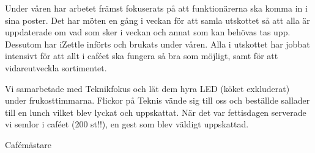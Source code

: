 \documentclass[../_main/handlingar.tex]{subfiles}
\begin{document}

Under våren har arbetet främst fokuserats på att funktionärerna ska komma in i sina poster. Det har möten en gång i veckan för att samla utskottet så att alla är uppdaterade om vad som sker i veckan och annat som kan behövas tas upp. Dessutom har iZettle införts och brukats under våren. Alla i utskottet har jobbat intensivt för att allt i caféet ska fungera så bra som möjligt, samt för att vidareutveckla sortimentet.

Vi samarbetade med Teknikfokus och lät dem hyra LED (köket exkluderat) under frukosttimmarna. Flickor på Teknis vände sig till oss och beställde sallader till en lunch vilket blev lyckat och uppskattat. När det var fettisdagen serverade vi semlor i caféet (200 st!!), en gest som blev väldigt uppskattad.

\begin{signatures}{1}
    \mvh
    \signature{Stephanie Mirsky}{Cafémästare}
\end{signatures}
\end{document}
